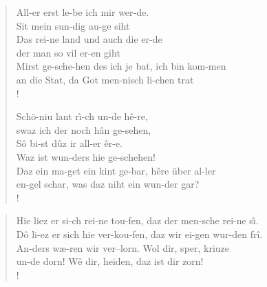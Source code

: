 \documentclass{article}
\begin{document}
\begin{center}
\framebox{\parbox{170mm}{
\begin{mus}  \end{mus}
}}
\framebox{
\begin{minipage}{170mm}
\begin{mus}  \end{mus}
\end{minipage}
}
\end{center}

\begin{figure}[h!]
\begin{minipage}{85mm}
\begin{verse} 
All-er erst le-be ich mir wer-de. \\
Sit mein sun-dig au-ge siht \\
Das rei-ne land und auch die er-de \\
der man so vil er-en giht \\ 
Mirst ge-sche-hen des ich je bat, ich bin kom-men \\
an die Stat, da Got men-nisch li-chen trat\\!


Sch\"o-niu lant r\^\i-ch un-de h\^e-re, \\
swaz ich der noch h\^an ge-sehen, \\
S\^o bi-st d\^uz ir all-er \^er-e. \\
Waz ist wun-ders hie ge-schehen! \\
Daz ein ma-get ein kint ge-bar, h\^ere \"uber al-ler  \\
en-gel schar, was daz niht ein wun-der gar?  \\!
\end{verse}
\end{minipage}
\begin{minipage}{85mm}
\begin{verse} 
Hie liez er si-ch rei-ne tou-fen, daz der men-sche rei-ne s\^\i. \\
D\^o li-ez er sich hie ver-kou-fen, daz wir ei-gen wur-den fr\^i. \\
An-ders w\ae-ren wir ver--lorn. Wol dir, sper, kriuze   \\
un-de dorn! W\^e dir, heiden, daz ist dir zorn! \\!
\end{verse}
\end{minipage}

\end{figure}
\end{document}
